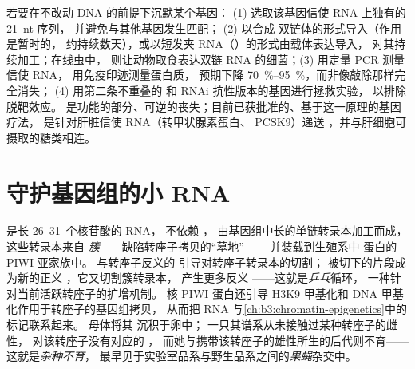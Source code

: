 \begin{method}\label{met:b3:rna-regulation:knockdown}
若要在不改动 DNA 的前提下沉默某个基因：
(1) 选取该基因信使 RNA 上独有的 \qty{21}{nt} 序列，
并避免与其他基因发生匹配；
(2) 以合成  双链体的形式导入（作用是暂时的，
约持续数天），或以短发夹 RNA（）的形式由载体表达导入，
 对其持续加工；在线虫中，
则让动物取食表达双链 RNA 的细菌；(3) 用定量 PCR 测量信使 RNA，
用免疫印迹测量蛋白质，
预期下降 \qtyrange{70}{95}{\%}，而非像敲除那样完全消失；
(4) 用第二条不重叠的  和 RNAi 抗性版本的基因进行拯救实验，
以排除脱靶效应。
是功能的部分、可逆的丧失；目前已获批准的、基于这一原理的基因疗法，
是针对肝脏信使 RNA（转甲状腺素蛋白、
PCSK9）递送 ，并与肝细胞可摄取的糖类相连。
\end{method}

\section{守护基因组的小 RNA}

\begin{definition}\label{def:b3:rna-regulation:pirna}
\emph{} 是长 \numrange{26}{31}~个核苷酸的 RNA，
不依赖 ，
由基因组中长的单链转录本加工而成，
这些转录本来自 \emph{ 簇}——缺陷转座子拷贝的“墓地”
——并装载到生殖系中  蛋白的 PIWI 亚家族中。
与转座子反义的  引导对转座子转录本的切割；
被切下的片段成为新的正义 ，它又切割簇转录本，
产生更多反义 ——这就是\emph{乒乓}循环，
一种针对当前活跃转座子的扩增机制。
核 PIWI 蛋白还引导 H3K9 甲基化和 DNA 甲基化作用于转座子的基因组拷贝，
从而把 RNA 与\cref{ch:b3:chromatin-epigenetics}中的标记联系起来。
母体将其  沉积于卵中；
一只其谱系从未接触过某种转座子的雌性，
对该转座子没有对应的 ，
而她与携带该转座子的雄性所生的后代则不育——这就是\emph{杂种不育}，
最早见于实验室品系与野生品系之间的\emph{果蝇}杂交中。
\end{definition}

